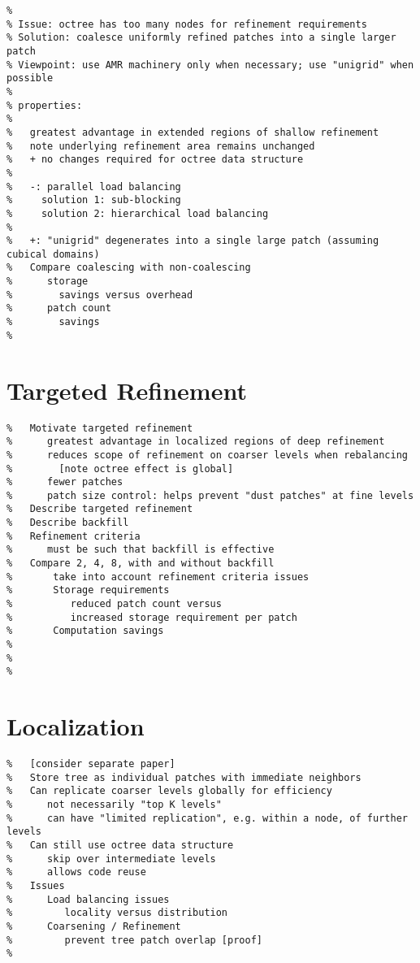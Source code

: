 \documentclass{article}
\begin{document}
\begin{verbatim}
% 
% Issue: octree has too many nodes for refinement requirements
% Solution: coalesce uniformly refined patches into a single larger patch
% Viewpoint: use AMR machinery only when necessary; use "unigrid" when possible
%
% properties:
%
%   greatest advantage in extended regions of shallow refinement
%   note underlying refinement area remains unchanged
%   + no changes required for octree data structure
%   
%   -: parallel load balancing
%     solution 1: sub-blocking
%     solution 2: hierarchical load balancing
%     
%   +: "unigrid" degenerates into a single large patch (assuming cubical domains)
%   Compare coalescing with non-coalescing
%      storage 
%        savings versus overhead
%      patch count
%        savings
%      

\end{verbatim}

\section{Targeted Refinement} \label{s:intro}

\begin{verbatim}
%   Motivate targeted refinement
%      greatest advantage in localized regions of deep refinement
%      reduces scope of refinement on coarser levels when rebalancing
%        [note octree effect is global]
%      fewer patches
%      patch size control: helps prevent "dust patches" at fine levels
%   Describe targeted refinement
%   Describe backfill
%   Refinement criteria
%      must be such that backfill is effective
%   Compare 2, 4, 8, with and without backfill
%       take into account refinement criteria issues
%       Storage requirements
%          reduced patch count versus
%          increased storage requirement per patch
%       Computation savings
%       
%          
%       
\end{verbatim}


\section{Localization} \label{s:intro}

\begin{verbatim}
%   [consider separate paper]
%   Store tree as individual patches with immediate neighbors
%   Can replicate coarser levels globally for efficiency
%      not necessarily "top K levels"
%      can have "limited replication", e.g. within a node, of further levels
%   Can still use octree data structure
%      skip over intermediate levels
%      allows code reuse
%   Issues
%      Load balancing issues
%         locality versus distribution
%      Coarsening / Refinement
%         prevent tree patch overlap [proof]
%      
\end{verbatim}
\end{document}
